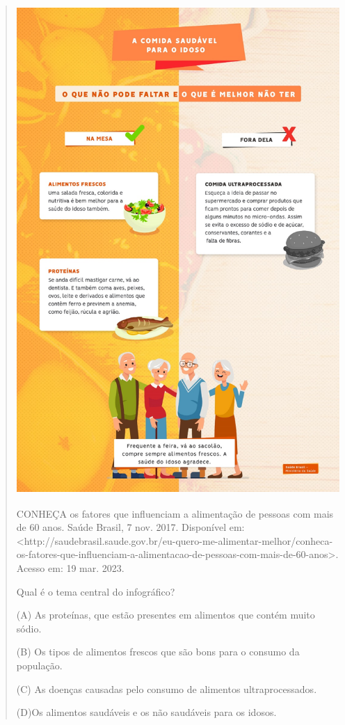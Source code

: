 \begin{itemize}
{{{\begin{itemize}
\begin{itemize}
\begin{itemize}
\begin{quote}
\includegraphics[width=4.87500in,height=7.31250in]{media/image38.jpeg}

CONHEÇA os fatores que influenciam a alimentação de pessoas com mais de
60 anos. Saúde Brasil, 7 nov. 2017. Disponível em:
\textless{}http://saudebrasil.saude.gov.br/eu-quero-me-alimentar-melhor/conheca-os-fatores-que-influenciam-a-alimentacao-de-pessoas-com-mais-de-60-anos\textgreater{}.
Acesso em: 19 mar. 2023.

Qual é o tema central do infográfico?

(A) As proteínas, que estão presentes em alimentos que contém muito
sódio.

(B) Os tipos de alimentos frescos que são bons para o consumo da
população.

(C) As doenças causadas pelo consumo de alimentos ultraprocessados.

(D)Os alimentos saudáveis e os não saudáveis para os idosos.


\end{quote}
\end{itemize}
\end{itemize}
\end{itemize}}}}
\end{itemize}
